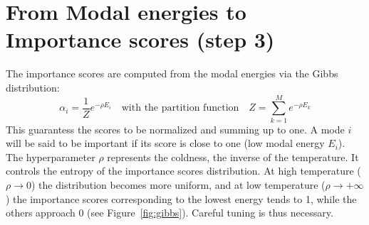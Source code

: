 
\section{From Modal energies to Importance scores (step 3)}
The importance scores are computed from the modal energies via the Gibbs distribution:
\begin{equation}
\alpha_i = \frac{1}{Z}e^{-\rho E_i} \quad \text{with the partition function} \quad Z = \sum_{k=1}^M e^{-\rho E_k} 
\label{eq:gibbs-distrib}
\end{equation}
This guarantess the scores to be normalized and summing up to one. A mode $i$ will be said to be important if its score is close to one (low modal energy $E_i$). The hyperparameter $\rho$ represents the coldness, the inverse of the temperature. It controls the entropy of the importance scores distribution. At high temperature ($\rho \rightarrow 0$) the distribution becomes more uniform, and at low temperature ($\rho \rightarrow +\infty$) the importance scores corresponding to the lowest energy tends to 1, while the others approach 0 (see Figure \,\ref{fig:gibbs}). Careful tuning is thus necessary.

